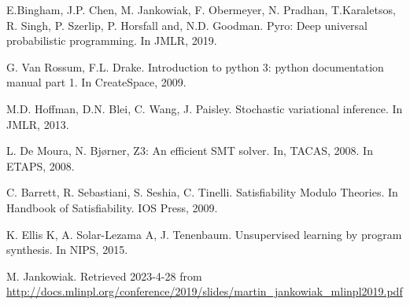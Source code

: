 \documentclass[letterpaper]{llncs}
\begin{document}
\begin{thebibliography}{9}

E.Bingham, J.P. Chen, M. Jankowiak, F. Obermeyer, N. Pradhan, T.Karaletsos, R. Singh, P. Szerlip, P. Horsfall and, N.D. Goodman. Pyro: Deep universal probabilistic programming. In JMLR, 2019. 

G. Van Rossum, F.L. Drake. Introduction to python 3: python documentation manual part 1. In CreateSpace, 2009.

M.D. Hoffman, D.N. Blei, C. Wang, J. Paisley. Stochastic variational inference. In JMLR, 2013.

L. De Moura, N. Bjørner, Z3: An efficient SMT solver. In, TACAS, 2008. In ETAPS, 2008.

C. Barrett, R. Sebastiani, S. Seshia, C. Tinelli. Satisfiability Modulo Theories. In
Handbook of Satisfiability. IOS Press, 2009.

K. Ellis K, A. Solar-Lezama A, J. Tenenbaum. Unsupervised learning by program synthesis. In NIPS, 2015.

M. Jankowiak. Retrieved 2023-4-28 from \url{http://docs.mlinpl.org/conference/2019/slides/martin_jankowiak_mlinpl2019.pdf} 


\end{thebibliography}
\end{document}
